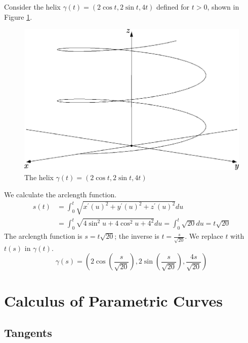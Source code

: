 \documentclass[fleqn,letterpaper]{report}
\begin{document}
\begin{example}
\label{example-helix-reparametrized}
Consider the helix $\gamma(t) = (2 \cos t, 2 \sin t, 4t)$
defined for $t > 0$, shown in Figure \ref{figure-helix}.

\begin{figure}[t]
\centering
\includegraphics[width=12cm]{figure21.eps}
\caption{The helix $\gamma(t) = (2 \cos t, 2 \sin t, 4t)$}
\label{figure-helix}
\end{figure} 

We calculate the arclength function.
\begin{align*}
s(t) & = \int_0^t \sqrt{x^\prime(u)^2 + y^\prime(u)^2 +
z^\prime(u)^2} du \\
& = \int_0^t \sqrt{4\sin^2 u + 4 \cos^2 u + 4^2} du = \int_0^t
\sqrt{20} du = t \sqrt{20}
\end{align*}
The arclength function is $s = t \sqrt{20}$; the inverse is $t =
\frac{s}{\sqrt{20}}$. We replace $t$ with $t(s)$ in 
$\gamma(t)$.
\begin{equation*}
\gamma(s) = \left( 2 \cos \left( \frac{s}{\sqrt{20}} \right),
2 \sin \left( \frac{s}{\sqrt{20}} \right),
\frac{4s}{\sqrt{20}} \right) 
\end{equation*}
\end{example}

\section{Calculus of Parametric Curves}
\label{calculus-of-parametric-curves}

\subsection{Tangents}
\label{tangents}
\end{document}
